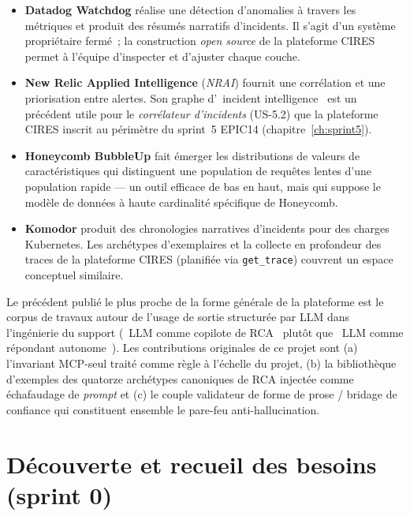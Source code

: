 \documentclass[11pt,a4paper,oneside]{report}
\begin{document}
\begin{itemize}
  \item \textbf{Datadog Watchdog} réalise une détection d'anomalies
        à travers les métriques et produit des résumés narratifs
        d'incidents. Il s'agit d'un système propriétaire fermé~; la
        construction \emph{open source} de la plateforme CIRES
        permet à l'équipe d'inspecter et d'ajuster chaque couche.
  \item \textbf{New Relic Applied Intelligence} (\emph{NRAI}) fournit
        une corrélation et une priorisation entre alertes. Son
        graphe d'\og~incident intelligence~\fg{} est un précédent
        utile pour le \emph{corrélateur d'incidents} (US-5.2) que la
        plateforme CIRES inscrit au périmètre du sprint~5 EPIC14
        (chapitre~\ref{ch:sprint5}).
  \item \textbf{Honeycomb BubbleUp} fait émerger les distributions
        de valeurs de caractéristiques qui distinguent une
        population de requêtes lentes d'une population rapide ---
        un outil efficace de bas en haut, mais qui suppose le
        modèle de données à haute cardinalité spécifique de
        Honeycomb.
  \item \textbf{Komodor} produit des chronologies narratives
        d'incidents pour des charges Kubernetes. Les archétypes
        d'exemplaires et la collecte en profondeur des traces de la
        plateforme CIRES (planifiée via \texttt{get\_trace})
        couvrent un espace conceptuel similaire.
\end{itemize}

Le précédent publié le plus proche de la forme générale de la
plateforme est le corpus de travaux autour de l'usage de sortie
structurée par LLM dans l'ingénierie du support (\og~LLM comme
copilote de RCA~\fg{} plutôt que \og~LLM comme répondant
autonome~\fg{}). Les contributions originales de ce projet sont (a)
l'invariant MCP-seul traité comme règle à l'échelle du projet, (b)
la bibliothèque d'exemples des quatorze archétypes canoniques de RCA
injectée comme échafaudage de \emph{prompt} et (c) le couple
validateur de forme de prose / bridage de confiance qui constituent
ensemble le pare-feu anti-hallucination.

\chapter{Découverte et recueil des besoins (sprint 0)}
\label{ch:discovery}
\end{document}
